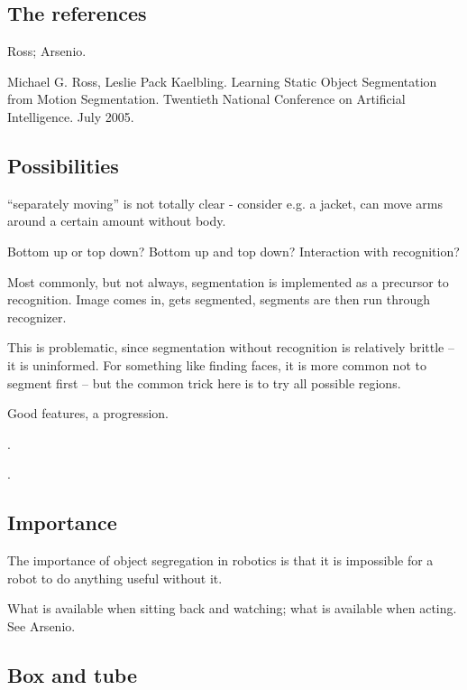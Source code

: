 \subsection{The references}

Ross; Arsenio.


Michael G. Ross, Leslie Pack Kaelbling. Learning Static Object
Segmentation from Motion Segmentation. Twentieth National Conference
on Artificial Intelligence. July 2005.

\subsection{Possibilities}

``separately moving'' is not totally clear - consider e.g. a 
jacket, can move arms around a certain amount without body.

Bottom up or top down?  Bottom up and top down?  Interaction
with recognition?

Most commonly, but not always, segmentation is implemented
as a precursor to recognition.  Image comes in, gets
segmented, segments are then run through recognizer.

This is problematic, since segmentation without
recognition is relatively brittle -- it is uninformed.
For something like finding faces, it is more common
not to segment first -- but the common trick here
is to try all possible regions.

Good features, a progression.

\cite{swain91color}.

\cite{schiele00recognition}.

\cite{lowe04distinctive}

\cite{felzenszwalb04efficient}

\subsection{Importance}

The importance of object segregation in robotics is 
that it is impossible for a robot to do anything 
useful without it.  

What is available when sitting back and watching; 
what is available when acting.  See Arsenio.



\subsection{Box and tube}


